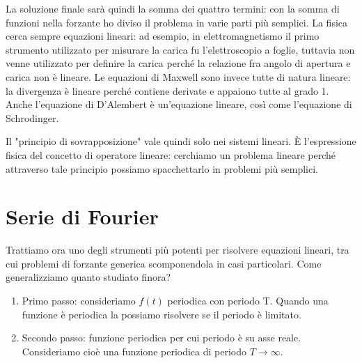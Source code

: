 La soluzione finale sarà quindi la somma dei quattro termini: con la somma di funzioni nella forzante ho diviso il problema in varie parti più semplici. La fisica cerca sempre equazioni lineari: ad esempio, in elettromagnetismo il primo strumento utilizzato per misurare la carica fu l'elettroscopio a foglie, tuttavia non venne utilizzato per definire la carica perché la relazione fra angolo di apertura e carica non è lineare. Le equazioni di Maxwell sono invece tutte di natura lineare: la divergenza è lineare perché contiene derivate e appaiono tutte al grado 1. Anche l'equazione di D'Alembert è un'equazione lineare, così come l'equazione di Schrodinger.

Il "principio di sovrapposizione" vale quindi solo nei sistemi lineari. È l'espressione fisica del concetto di operatore lineare: cerchiamo un problema lineare perché attraverso tale principio possiamo spacchettarlo in problemi più semplici.

\section{Serie di Fourier}

Trattiamo ora uno degli strumenti più potenti per risolvere equazioni lineari, tra cui problemi di forzante generica scomponendola in casi particolari. Come generalizziamo quanto studiato finora?
\begin{enumerate}
	
	\item Primo passo: consideriamo \(f(t)\) periodica con periodo T. Quando una funzione è periodica la possiamo risolvere se il periodo è limitato.
	\item Secondo passo: funzione periodica per cui periodo è su asse reale. Consideriamo cioè una funzione periodica di periodo \(T \to \infty \).  
\end{enumerate}

